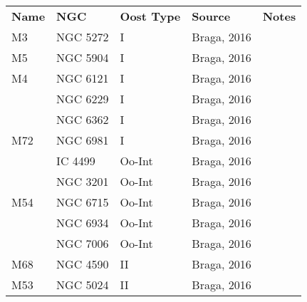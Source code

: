 \documentclass[]{article}
\begin{document}
\begin{longtable}{
	p{1.5cm}|
	p{2.5cm}|
	p{2.5cm}|
	p{3.7cm}|
	p{5.5cm}
	@{}}
		\textbf{Name}           & \textbf{NGC}          & \textbf{Oost Type}  & \textbf{Source}               & \textbf{Notes}                                                                  \vspace{12pt}\\
		M3             & NGC 5272     & I          & Braga, 2016 \cite{braga_2016}         &                                                                        \\
		M5             & NGC 5904     & I          & Braga, 2016          &                                                                        \\
		M4             & NGC 6121     & I          & Braga, 2016          &                                                                        \\
		& NGC 6229     & I          & Braga, 2016          &                                                                        \\
		& NGC 6362     & I          & Braga, 2016          &                                                                        \\
		M72            & NGC 6981     & I          & Braga, 2016          &                                                                        \\
		& IC 4499      & Oo-Int     & Braga, 2016          &                                                                        \\
		& NGC 3201     & Oo-Int     & Braga, 2016          &                                                                        \\
		M54            & NGC 6715     & Oo-Int     & Braga, 2016          &                                                                        \\
		& NGC 6934     & Oo-Int     & Braga, 2016          &                                                                        \\
		& NGC 7006     & Oo-Int     & Braga, 2016          &                                                                        \\
		M68            & NGC 4590     & II         & Braga, 2016          &                                                                        \\
		M53            & NGC 5024     & II         & Braga, 2016          &                                                                        \\

\end{longtable}
\end{document}
